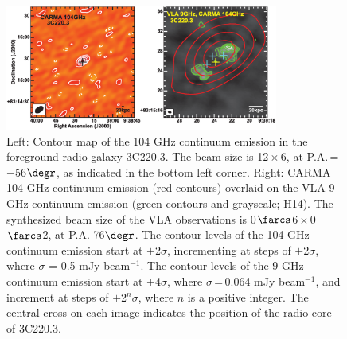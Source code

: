 \documentclass[twocolumn,apj,numberedappendix]{emulateapj}
\newcommand{\CO}{\mbox{CO($J$\,=\,3\,$\rightarrow$\,2) }}
\newcommand{\pmOne}{\mbox{$^{-1}$}}
\begin{document}
\begin{figure}[tbph]
\centering
\includegraphics[width=0.80\textwidth]{Figure/ContPanel_cmyk.eps}
\caption{Left: Contour map of the 104 GHz continuum emission in the foreground radio galaxy 3C220.3.
The beam size is 12\,$\times$\,6, at P.A.\,=\,
$-$56$\degr$, as indicated in the bottom left corner. Right: CARMA 104 GHz continuum emission (red contours) overlaid on the VLA 9 GHz continuum emission (green contours and grayscale; H14).
The synthesized beam size of the VLA observations is 0$\farcs$6\,$\times$\,0$\farcs$2, at P.A.
76$\degr$. The contour levels of the 104 GHz continuum emission start at $\pm$2$\sigma$, incrementing at steps
of $\pm$2$\sigma$, where $\sigma$ = 0.5 mJy beam\pmOne. The contour levels of the 9 GHz continuum
emission start at $\pm$4$\sigma$, where $\sigma$\,=\,0.064 mJy beam\pmOne, and increment at steps of $\pm$2$^n\sigma$,
where $n$ is a positive integer.
The central cross on each image indicates the position of the radio core of 3C220.3. \label{fig:cont}}
\end{figure}
\end{document}
